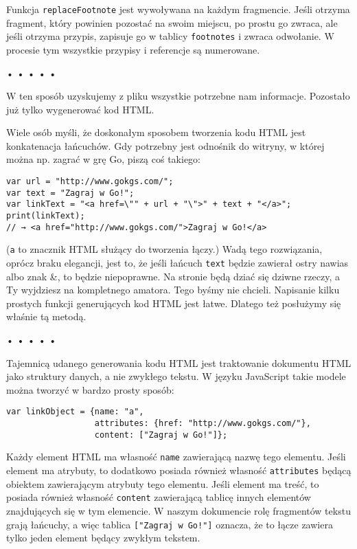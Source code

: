 Funkcja \texttt{replaceFootnote} jest wywoływana na każdym fragmencie. Jeśli otrzyma fragment, który powinien pozostać na swoim miejscu, po prostu go zwraca, ale jeśli otrzyma przypis, zapisuje go w tablicy \texttt{footnotes} i zwraca odwołanie. W procesie tym wszystkie przypisy i referencje są numerowane.



\begin{center}
• • • • •
\end{center}

  
W ten sposób uzyskujemy z pliku wszystkie potrzebne nam informacje. Pozostało już tylko wygenerować kod HTML.

  
Wiele osób myśli, że doskonałym sposobem tworzenia kodu HTML jest konkatenacja łańcuchów. Gdy potrzebny jest odnośnik do witryny, w której można np. zagrać w grę Go, piszą coś takiego:

  
\begin{verbatim} 
var url = "http://www.gokgs.com/";
var text = "Zagraj w Go!";
var linkText = "<a href=\"" + url + "\">" + text + "</a>";
print(linkText);
// → <a href="http://www.gokgs.com/">Zagraj w Go!</a>
\end{verbatim}
  
(\texttt{a} to znacznik HTML służący do tworzenia łączy.) Wadą tego rozwiązania, oprócz braku elegancji, jest to, że jeśli łańcuch \texttt{text} będzie zawierał ostry nawias albo znak \&, to będzie niepoprawne. Na stronie będą dziać się dziwne rzeczy, a Ty wyjdziesz na kompletnego amatora. Tego byśmy nie chcieli. Napisanie kilku prostych funkcji generujących kod HTML jest łatwe. Dlatego też posłużymy się właśnie tą metodą.



\begin{center}
• • • • •
\end{center}

  
Tajemnicą udanego generowania kodu HTML jest traktowanie dokumentu HTML jako struktury danych, a nie zwykłego tekstu. W języku JavaScript takie modele można tworzyć w bardzo prosty sposób:

  
\begin{verbatim} 
var linkObject = {name: "a",
                  attributes: {href: "http://www.gokgs.com/"},
                  content: ["Zagraj w Go!"]};
 \end{verbatim}
  
Każdy element HTML ma własność \texttt{name} zawierającą nazwę tego elementu. Jeśli element ma atrybuty, to dodatkowo posiada również własność \texttt{attributes} będącą obiektem zawierającym atrybuty tego elementu. Jeśli element ma treść, to posiada również własność \texttt{content} zawierającą tablicę innych elementów znajdujących się w tym elemencie. W naszym dokumencie rolę fragmentów tekstu grają łańcuchy, a więc tablica \texttt{["Zagraj w Go!"]} oznacza, że to łącze zawiera tylko jeden element będący zwykłym tekstem.

